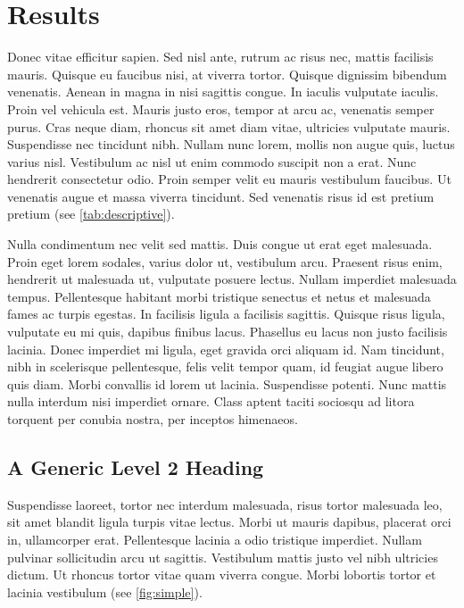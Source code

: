 \section{Results}
\label{sec:4}

Donec vitae efficitur sapien. Sed nisl ante, rutrum ac risus nec, mattis facilisis mauris. Quisque eu faucibus nisi, at viverra tortor. Quisque dignissim bibendum venenatis. Aenean in magna in nisi sagittis congue. In iaculis vulputate iaculis. Proin vel vehicula est. Mauris justo eros, tempor at arcu ac, venenatis semper purus. Cras neque diam, rhoncus sit amet diam vitae, ultricies vulputate mauris. Suspendisse nec tincidunt nibh. Nullam nunc lorem, mollis non augue quis, luctus varius nisl. Vestibulum ac nisl ut enim commodo suscipit non a erat. Nunc hendrerit consectetur odio. Proin semper velit eu mauris vestibulum faucibus. Ut venenatis augue et massa viverra tincidunt. Sed venenatis risus id est pretium pretium (see \cref{tab:descriptive}).

Nulla condimentum nec velit sed mattis. Duis congue ut erat eget malesuada. Proin eget lorem sodales, varius dolor ut, vestibulum arcu. Praesent risus enim, hendrerit ut malesuada ut, vulputate posuere lectus. Nullam imperdiet malesuada tempus. Pellentesque habitant morbi tristique senectus et netus et malesuada fames ac turpis egestas. In facilisis ligula a facilisis sagittis. Quisque risus ligula, vulputate eu mi quis, dapibus finibus lacus. Phasellus eu lacus non justo facilisis lacinia. Donec imperdiet mi ligula, eget gravida orci aliquam id. Nam tincidunt, nibh in scelerisque pellentesque, felis velit tempor quam, id feugiat augue libero quis diam. Morbi convallis id lorem ut lacinia. Suspendisse potenti. Nunc mattis nulla interdum nisi imperdiet ornare. Class aptent taciti sociosqu ad litora torquent per conubia nostra, per inceptos himenaeos.



\subsection{A Generic Level 2 Heading}

Suspendisse laoreet, tortor nec interdum malesuada, risus tortor malesuada leo, sit amet blandit ligula turpis vitae lectus. Morbi ut mauris dapibus, placerat orci in, ullamcorper erat. Pellentesque lacinia a odio tristique imperdiet. Nullam pulvinar sollicitudin arcu ut sagittis. Vestibulum mattis justo vel nibh ultricies dictum. Ut rhoncus tortor vitae quam viverra congue. Morbi lobortis tortor et lacinia vestibulum (see \cref{fig:simple}).

